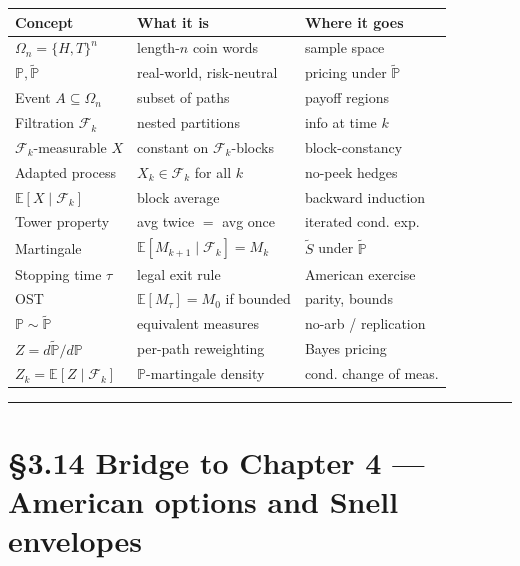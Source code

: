 \documentclass[
  10pt,
  twoside]{book}
\newcounter{none} %
\begin{document}
{\def\LTcaptype{none} %
\begin{table}[H]
\centering
\begin{tabular}{|l|l|l|}
\toprule
Concept & What it is & Where it goes \\
\midrule



\(\Omega_n = \{H,T\}^n\) & length-\(n\) coin words & sample space \\
\(\mathbb P, \tilde{\mathbb P}\) & real-world, risk-neutral & pricing
under \(\tilde{\mathbb P}\) \\
Event \(A \subseteq \Omega_n\) & subset of paths & payoff regions \\
Filtration \(\mathcal F_k\) & nested partitions & info at time \(k\) \\
\(\mathcal F_k\)-measurable \(X\) & constant on \(\mathcal F_k\)-blocks
& block-constancy \\
Adapted process & \(X_k \in \mathcal F_k\) for all \(k\) & no-peek
hedges \\
\(\mathbb E[X \mid \mathcal F_k]\) & block average & backward
induction \\
Tower property & avg twice \(=\) avg once & iterated cond. exp. \\
Martingale & \(\mathbb E[M_{k+1} \mid \mathcal F_k] = M_k\) &
\(\widetilde S\) under \(\tilde{\mathbb P}\) \\
Stopping time \(\tau\) & legal exit rule & American exercise \\
OST & \(\mathbb E[M_\tau] = M_0\) if bounded & parity, bounds \\
\(\mathbb P \sim \tilde{\mathbb P}\) & equivalent measures & no-arb /
replication \\
\(Z = d\tilde{\mathbb P}/d\mathbb P\) & per-path reweighting & Bayes
pricing \\
\(Z_k = \mathbb E[Z \mid \mathcal F_k]\) & \(\mathbb P\)-martingale
density & cond. change of meas. \\
\bottomrule
\end{tabular}
\end{table}
}

\begin{center}\rule{0.5\linewidth}{0.5pt}\end{center}

\section{§3.14 Bridge to Chapter 4 --- American options and Snell
envelopes}\label{bridge-to-chapter-4-american-options-and-snell-envelopes}
\end{document}
